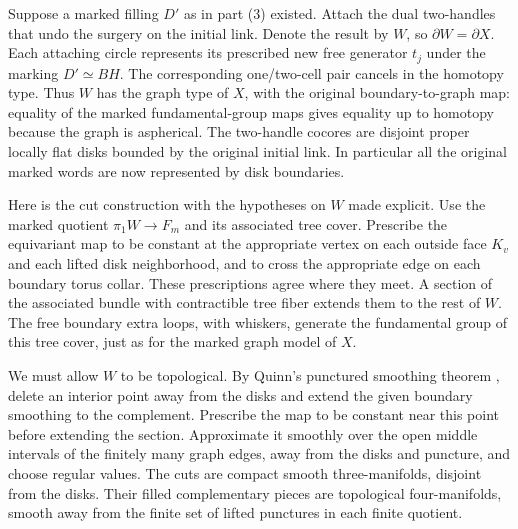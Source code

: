 Suppose a marked filling $D'$ as in part (3) existed.  Attach the
dual two-handles that undo the surgery on the initial link.  Denote
the result by $W$, so $\partial W=\partial X$.  Each attaching circle
represents its prescribed new free generator $t_j$ under the marking
$D'\simeq BH$.  The corresponding one/two-cell pair cancels in the
homotopy type.  Thus $W$ has the graph type of $X$, with the original
boundary-to-graph map: equality of the marked fundamental-group maps
gives equality up to homotopy because the graph is aspherical.
The two-handle cocores are disjoint proper locally flat disks bounded
by the original initial link.  In particular all the original marked
words are now represented by disk boundaries.

Here is the cut construction with the hypotheses on $W$ made explicit.
Use the marked quotient $\pi_1W\to F_m$ and its associated tree cover.
Prescribe the equivariant map to be constant at the appropriate vertex
on each outside face $K_v$ and each lifted disk neighborhood, and
to cross the appropriate edge on each boundary torus collar.  These
prescriptions agree where they meet.  A section of the associated
bundle with contractible tree fiber extends them to the rest of $W$.
The free boundary extra loops, with whiskers, generate the fundamental
group of this tree cover, just as for the marked graph model of $X$.

We must allow $W$ to be topological.  By Quinn's punctured smoothing
theorem \cite[Corollary~2.2.3]{QuinnEnds}, delete an interior point
away from the disks and extend the given boundary smoothing to the
complement.  Prescribe the map to be constant near this point before
extending the section.  Approximate it smoothly over the open middle
intervals of the finitely many graph edges, away from the disks and
puncture, and choose regular values.  The cuts are compact smooth
three-manifolds, disjoint from the disks.  Their filled complementary
pieces are topological four-manifolds, smooth away from the finite
set of lifted punctures in each finite quotient.

